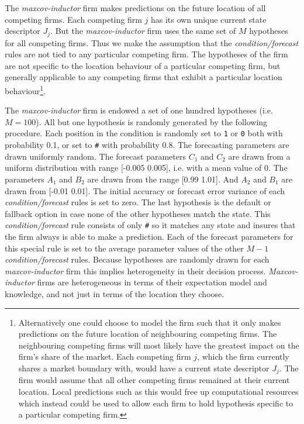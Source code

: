 \documentclass[preprint, 12pt]{elsarticle}
\begin{document}
The \emph{maxcov-inductor} firm makes predictions on the future location of all competing firms. Each competing firm $j$ has its own unique current state descriptor $J_j$. But the \emph{maxcov-inductor} firm uses the same set of $M$ hypotheses for all competing firms. Thus we make the assumption that the \emph{condition/forecast} rules are not tied to any particular competing firm. The hypotheses of the firm are not specific to the location behaviour of a particular competing firm, but generally applicable to any competing firms that exhibit a particular location behaviour\footnote{Alternatively one could choose to model the firm such that it only makes predictions on the future location of neighbouring competing firms. The neighbouring competing firms will most likely have the greatest impact on the firm's share of the market. Each competing firm $j$, which the firm currently shares a market boundary with, would have a current state descriptor $J_j$. The firm would assume that all other competing firms remained at their current location. Local predictions such as this would free up computational resources which instead could be used to allow each firm to hold hypothesis specific to a particular competing firm.}. 

The \emph{maxcov-inductor} firm is endowed a set of one hundred hypotheses (i.e. $M=100$). All but one hypothesis is randomly generated by the following procedure. Each position in the condition is randomly set to \texttt{1} or \texttt{0} both with probability 0.1, or set to \texttt{\#} with probability 0.8. The forecasting parameters are drawn uniformly random. The forecast parameters $C_1$ and $C_2$ are drawn from a uniform distribution with range [-0.005 0.005], i.e. with a mean value of 0. The parameters $A_1$ and $B_2$ are drawn from the range [0.99 1.01]. And $A_2$ and $B_1$ are drawn from [-0.01 0.01]. The initial accuracy or forecast error variance of each \emph{condition/forecast} rules is set to zero. The last hypothesis is the default or fallback option in case none of the other hypotheses match the state. This \emph{condition/forecast} rule consists of only \texttt{\#} so it matches any state and insures that the firm always is able to make a prediction. Each of the forecast parameters for this special rule is set to the average parameter values of the other $M-1$ \emph{condition/forecast} rules. Because hypotheses are randomly drawn for each \emph{maxcov-inductor} firm this implies heterogeneity in their decision process. \emph{Maxcov-inductor} firms are heterogeneous in terms of their expectation model and knowledge, and not just in terms of the location they choose.
\end{document}
